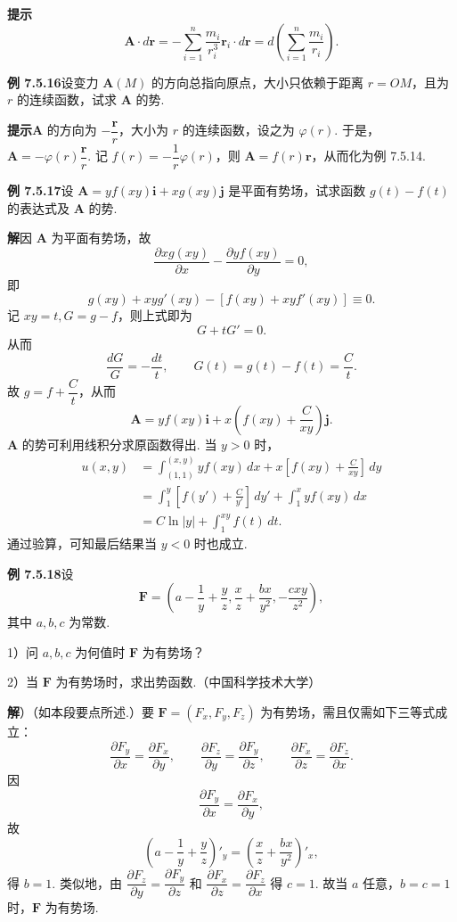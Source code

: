 \documentclass[UTF8, 12pt, fontset=fandol, oneside]{ctexart}
\begin{document}
\noindent\textbf{提示}\quad
\[
\mathbf A\cdot d\mathbf r=-\sum_{i=1}^n\frac{m_i}{r_i^3}\mathbf r_i\cdot d\mathbf r
=d\left(\sum_{i=1}^n\frac{m_i}{r_i}\right).
\]

\noindent\textbf{例 7.5.16}\quad 设变力 $\mathbf A(M)$ 的方向总指向原点，大小只依赖于距离 $r=OM$，且为 $r$ 的连续函数，试求 $\mathbf A$ 的势.

\noindent\textbf{提示}\quad $\mathbf A$ 的方向为 $-\dfrac{\mathbf r}{r}$，大小为 $r$ 的连续函数，设之为 $\varphi(r)$. 于是，$\mathbf A=-\varphi(r)\dfrac{\mathbf r}{r}$.
记 $f(r)=-\dfrac1r\varphi(r)$，则 $\mathbf A=f(r)\mathbf r$，从而化为例 7.5.14.

\noindent\textbf{例 7.5.17}\quad 设 $\mathbf A=yf(xy)\mathbf i+xg(xy)\mathbf j$ 是平面有势场，试求函数 $g(t)-f(t)$ 的表达式及 $\mathbf A$ 的势.

\noindent\textbf{解}\quad 因 $\mathbf A$ 为平面有势场，故
\[
\frac{\partial xg(xy)}{\partial x}-\frac{\partial yf(xy)}{\partial y}=0,
\]
即
\[
g(xy)+xyg'(xy)-[f(xy)+xyf'(xy)]\equiv0.
\]
记 $xy=t,G=g-f$，则上式即为
\[
G+tG'=0.
\]
从而
\[
\frac{dG}{G}=-\frac{dt}{t},\qquad G(t)=g(t)-f(t)=\frac Ct.
\]
故 $g=f+\dfrac Ct$，从而
\[
\mathbf A=yf(xy)\mathbf i+x\left(f(xy)+\frac C{xy}\right)\mathbf j.
\]
$\mathbf A$ 的势可利用线积分求原函数得出. 当 $y>0$ 时，
\[
\begin{aligned}
u(x,y)
&=\int_{(1,1)}^{(x,y)}yf(xy)\,dx+x\left[f(xy)+\frac C{xy}\right]\,dy\\
&=\int_1^y\left[f(y')+\frac C{y'}\right]\,dy'
+\int_1^x yf(xy)\,dx\\
&=C\ln|y|+\int_1^{xy}f(t)\,dt.
\end{aligned}
\]
通过验算，可知最后结果当 $y<0$ 时也成立.

\noindent\textbf{例 7.5.18}\quad 设
\[
\mathbf F=\left(a-\frac1y+\frac yz,\frac xz+\frac{bx}{y^2},-\frac{cxy}{z^2}\right),
\]
其中 $a,b,c$ 为常数.

1）问 $a,b,c$ 为何值时 $\mathbf F$ 为有势场？

2）当 $\mathbf F$ 为有势场时，求出势函数.（中国科学技术大学）

\noindent\textbf{解}）（如本段要点所述.）要 $\mathbf F=(F_x,F_y,F_z)$ 为有势场，需且仅需如下三等式成立：
\[
\frac{\partial F_y}{\partial x}=\frac{\partial F_x}{\partial y},\qquad
\frac{\partial F_z}{\partial y}=\frac{\partial F_y}{\partial z},\qquad
\frac{\partial F_x}{\partial z}=\frac{\partial F_z}{\partial x}.
\]
因
\[
\frac{\partial F_y}{\partial x}=\frac{\partial F_x}{\partial y},
\]
故
\[
\left(a-\frac1y+\frac yz\right)'_y=\left(\frac xz+\frac{bx}{y^2}\right)'_x,
\]
得 $b=1$.
类似地，由 $\dfrac{\partial F_z}{\partial y}=\dfrac{\partial F_y}{\partial z}$ 和 $\dfrac{\partial F_x}{\partial z}=\dfrac{\partial F_z}{\partial x}$ 得 $c=1$. 故当 $a$ 任意，$b=c=1$ 时，$\mathbf F$ 为有势场.
\end{document}
